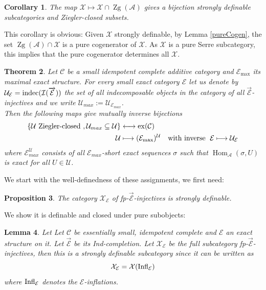 \documentclass[11pt,a4paper]{amsart}
\theoremstyle{plain}
\newtheorem{thm}{Theorem}[section]
\newtheorem{lem}[thm]{Lemma}
\newtheorem{pro}[thm]{Proposition}
\newtheorem{cor}[thm]{Corollary}
\theoremstyle{definition}
\DeclareMathOperator{\Hom}{Hom}
\newcommand{\mcA}{\mathcal{A}}
\newcommand{\mcC}{\mathcal{C}}
\newcommand{\mcE}{\mathcal{E}}
\newcommand{\mcI}{\mathcal{I}}
\newcommand{\mcU}{\mathcal{U}}
\newcommand{\mcX}{\mathcal{X}}
\DeclareMathOperator{\exact}{ex}
\DeclareMathOperator{\Zg}{Zg}
\begin{document}
\begin{cor} \label{bijStronglyDef}
The map $\mcX\mapsto \mcX\cap \Zg(\mcA)$ gives a bijection strongly definable subcategories and Ziegler-closed subsets.     
\end{cor}

This corollary is obvious: Given $\mcX$ strongly definable, by Lemma \ref{pureCogen}, the set $\Zg(\mcA)\cap \mcX$ is a pure cogenerator of $\mcX$. As $\mcX$ is a pure Serre subcategory, this implies that the pure cogenerator determines all $\mcX$. 





\begin{thm} \label{FirstBij}
Let $\mcC$ be a small idempotent complete additive category and $\mcE_{\max}$ its maximal exact structure. For every small exact category $\mcE$ let us denote by $\mcU_{\mcE}={\rm indec} (\mcI(\overrightarrow{\mcE}))$ the set of all indecomposable objects in the category of all $\overrightarrow{\mcE}$-injectives and we write %
$\mcU_{max}:=\mcU_{\mcE_{max}}$. \\
Then the following maps give mutually inverse bijections  
\[
\begin{aligned}
\{\mcU \text{ Ziegler-closed }, \mcU_{max} \subseteq \mcU\} & \longleftrightarrow \exact (\mcC)\\
\mcU &\longmapsto (\mcE_{\rm max})^{\mcU} \quad \text{with inverse } \; \mcE\longmapsto \mcU_{\mcE}\end{aligned}
\]
where $\mcE_{max}^{\mcU}$ consists of all $\mcE_{max}$-short exact sequences $\sigma$ such that $\Hom_{\mcA} (\sigma , U)$ is exact for all $U \in \mcU$. 
\end{thm}

We start with the well-definedness of these assignments, we first need: 
\begin{pro}
The category $\mcX_{\mcE}$ of fp-$\overrightarrow{\mcE}$-injectives is strongly definable.     
\end{pro}
We show it is definable and closed under pure subobjects: 
\begin{lem} \label{fp-injsDefinable}Let 
Let $\mcC$ be essentially small, idempotent complete  and $\mcE$ an exact structure on it. Let $\overrightarrow{\mcE}$ be its Ind-completion. 
Let $\mcX_{\mcE}$ be the full subcategory fp-$\overrightarrow{\mcE}$-injectives, then this is a strongly definable subcategory since it can be written as 
\[
\mcX_{\mcE}=\mcX({\rm Infl}_{\mcE})
\]
where ${\rm Infl}_{\mcE}$ denotes the $\mcE$-inflations.    
\end{lem}
\end{document}

